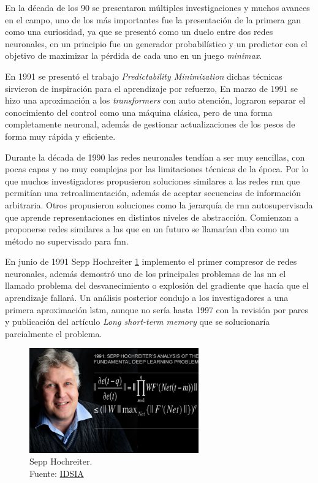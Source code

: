 En la década de los 90 se presentaron múltiples investigaciones y muchos avances en el campo, uno de los más importantes fue la presentación de la primera \acrshort{gan} como una curiosidad, ya que se presentó como un duelo entre dos redes neuronales, en un principio fue un generador probabilístico y un predictor con el objetivo de maximizar la pérdida de cada uno en un juego \textit{minimax}.

En 1991 se presentó el trabajo \textit{Predictability Minimization} \cite{urgen1991learning} dichas técnicas sirvieron de inspiración para el aprendizaje por refuerzo,
En marzo de 1991 se hizo una aproximación a los \textit{transformers} con auto atención, lograron separar el conocimiento del control como una máquina clásica, pero de una forma completamente neuronal, además de gestionar actualizaciones de los pesos de forma muy rápida y eficiente.

Durante la década de 1990 las redes neuronales tendían a ser muy sencillas, con pocas capas y no muy complejas por las limitaciones técnicas de la época.
Por lo que muchos investigadores propusieron soluciones similares a las redes \acrshort{rnn} que permitían una retroalimentación, además de aceptar secuencias de información arbitraria.
Otros propusieron soluciones como la jerarquía de \acrshort{rnn} autosupervisada que aprende representaciones en distintos niveles de abstracción.
Comienzan a proponerse redes similares a las que en un futuro se llamarían \acrshort{dbn} como un método no supervisado para \acrshort{fnn}.

En junio de 1991 {Sepp Hochreiter} \ref{fig:sepp-hochreiter} implemento el primer compresor de redes neuronales, además demostró uno de los principales problemas de las \acrshort{nn} el llamado problema del desvanecimiento o explosión del gradiente que hacía que el aprendizaje fallará.
Un análisis posterior condujo a los investigadores a una primera aproximación \acrshort{lstm}, aunque no sería hasta 1997 con la revisión por pares y publicación del artículo \textit{Long short-term memory} \cite{hochreiter1997long} que se solucionaría parcialmente el problema.

\begin{figure}[H]
  \centering
  \includegraphics[width=0.65\textwidth]{figures/Sepp Hochreiter.jpg}
  \caption{Sepp Hochreiter. \\Fuente: \href{https://people.idsia.ch/~juergen/fundamentaldeeplearningproblem.html}{IDSIA}}
  \label{fig:sepp-hochreiter}
\end{figure}

